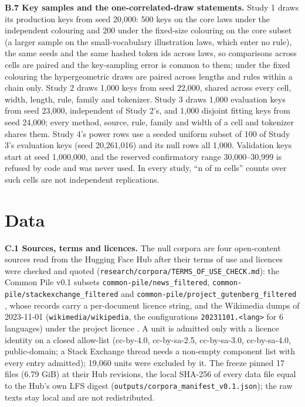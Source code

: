 \documentclass[11pt,letterpaper]{article}
\begin{document}
\textbf{B.7 Key samples and the one-correlated-draw statements.} Study 1 draws its production keys from seed 20,000: 500 keys on the core laws under the independent colouring and 200 under the fixed-size colouring on the core subset (a larger sample on the small-vocabulary illustration laws, which enter no rule), the same seeds and the same hashed token ids across laws, so comparisons across cells are paired and the key-sampling error is common to them; under the fixed colouring the hypergeometric draws are paired across lengths and rules within a chain only. Study 2 draws 1,000 keys from seed 22,000, shared across every cell, width, length, rule, family and tokenizer. Study 3 draws 1,000 evaluation keys from seed 23,000, independent of Study 2's, and 1,000 disjoint fitting keys from seed 24,000; every method, source, rule, family and width of a cell and tokenizer shares them. Study 4's power rows use a seeded uniform subset of 100 of Study 3's evaluation keys (seed 20,261,016) and its null rows all 1,000. Validation keys start at seed 1,000,000, and the reserved confirmatory range 30,000--30,999 is refused by code and was never used. In every study, ``n of m cells'' counts over such cells are not independent replications.

\hypertarget{data}{%
\section{Data}\label{data}}

\textbf{C.1 Sources, terms and licences.} The null corpora are four open-content sources read from the Hugging Face Hub after their terms of use and licences were checked and quoted (\texttt{research/\allowbreak{}corpora/\allowbreak{}TERMS\_\allowbreak{}OF\_\allowbreak{}USE\_\allowbreak{}CHECK.\allowbreak{}md}): the Common Pile v0.1 subsets \texttt{common-\allowbreak{}pile/\allowbreak{}news\_\allowbreak{}filtered}, \texttt{common-\allowbreak{}pile/\allowbreak{}stackexchange\_\allowbreak{}filtered} and \texttt{common-\allowbreak{}pile/\allowbreak{}project\_\allowbreak{}gutenberg\_\allowbreak{}filtered} \citep{kandpal2025commonpile}, whose records carry a per-document licence string, and the Wikimedia dumps of 2023-11-01 (\texttt{wikimedia/\allowbreak{}wikipedia}, the configurations \texttt{2023\allowbreak{}1101.\allowbreak{}\textless{}lang\textgreater{}} for 6 languages) under the project licence \citep{wikimedia2023dump}. A unit is admitted only with a licence identity on a closed allow-list (cc-by-4.0, cc-by-sa-2.5, cc-by-sa-3.0, cc-by-sa-4.0, public-domain; a Stack Exchange thread needs a non-empty component list with every entry admitted); 19,060 units were excluded by it. The freeze pinned 17 files (6.79 GiB) at their Hub revisions, the local SHA-256 of every data file equal to the Hub's own LFS digest (\texttt{outputs/\allowbreak{}corpora\_\allowbreak{}manifest\_\allowbreak{}v0.\allowbreak{}1.\allowbreak{}json}); the raw texts stay local and are not redistributed.
\end{document}
